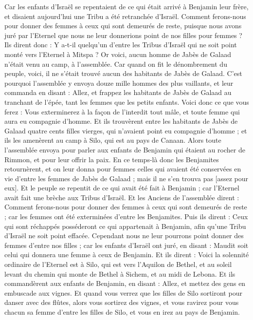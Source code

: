\begin{multicols}{2}
Car les enfants d'Israël se repentaient de ce qui était arrivé à Benjamin leur frère, et disaient aujourd'hui une Tribu a été retranchée d'Israël.
Comment ferons-nous pour donner des femmes à ceux qui sont demeurés de reste, puisque nous avons juré par l'Eternel que nous ne leur donnerions point de nos filles pour femmes ?
Ils dirent donc : Y a-t-il quelqu'un d'entre les Tribus d'Israël qui ne soit point monté vers l'Eternel à Mitspa ? Or voici, aucun homme de Jabès de Galaad n'était venu au camp, à l'assemblée.
Car quand on fit le dénombrement du peuple, voici, il ne s'était trouvé aucun des habitants de Jabès de Galaad.
C'est pourquoi l'assemblée y envoya douze mille hommes des plus vaillants, et leur commanda en disant : Allez, et frappez les habitants de Jabès de Galaad au tranchant de l'épée, tant les femmes que les petits enfants.
Voici donc ce que vous ferez : Vous exterminerez à la façon de l'interdit tout mâle, et toute femme qui aura eu compagnie d'homme.
Et ils trouvèrent entre les habitants de Jabès de Galaad quatre cents filles vierges, qui n'avaient point eu compagnie d'homme ; et ils les amenèrent au camp à Silo, qui est au pays de Canaan.
Alors toute l'assemblée envoya pour parler aux enfants de Benjamin qui étaient au rocher de Rimmon, et pour leur offrir la paix.
En ce temps-là donc les Benjamites retournèrent, et on leur donna pour femmes celles qui avaient été conservées en vie d'entre les femmes de Jabès de Galaad ; mais il ne s'en trouva pas [assez pour eux].
Et le peuple se repentit de ce qui avait été fait à Benjamin ; car l'Eternel avait fait une brèche aux Tribus d'Israël.
Et les Anciens de l'assemblée dirent : Comment ferons-nous pour donner des femmes à ceux qui sont demeurés de reste ; car les femmes ont été exterminées d'entre les Benjamites.
Puis ils dirent : Ceux qui sont réchappés posséderont ce qui appartenait à Benjamin, afin qu'une Tribu d'Israël ne soit point effacée.
Cependant nous ne leur pourrons point donner des femmes d'entre nos filles ; car les enfants d'Israël ont juré, en disant : Maudit soit celui qui donnera une femme à ceux de Benjamin.
Et ils dirent : Voici la solennité ordinaire de l'Eternel est à Silo, qui est vers l'Aquilon de Bethel, et au soleil levant du chemin qui monte de Bethel à Sichem, et au midi de Lebona.
Et ils commandèrent aux enfants de Benjamin, en disant : Allez, et mettez des gens en embuscade aux vignes.
Et quand vous verrez que les filles de Silo sortiront pour danser avec des flûtes, alors vous sortirez des vignes, et vous ravirez pour vous chacun sa femme d'entre les filles de Silo, et vous en irez au pays de Benjamin.

\end{multicols}
